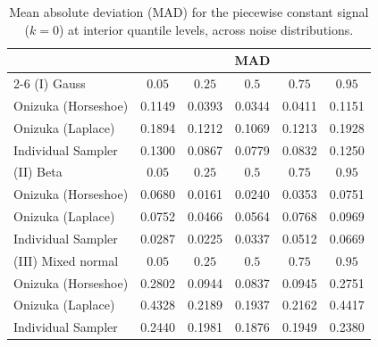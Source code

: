 \begin{table}[htbp]
\centering
\caption{Mean absolute deviation (MAD) for the piecewise constant signal ($k=0$) at interior quantile levels, across noise distributions.}
\label{tab:pc_int_mad}
\begin{tabular}{lccccc}
\toprule
& \multicolumn{5}{c}{MAD} \\
\cmidrule(lr){2-6}
(I) Gauss & $0.05$ & $0.25$ & $0.5$ & $0.75$ & $0.95$ \\
\midrule
Onizuka (Horseshoe) & 0.1149 & 0.0393 & 0.0344 & 0.0411 & 0.1151 \\
Onizuka (Laplace)   & 0.1894 & 0.1212 & 0.1069 & 0.1213 & 0.1928 \\
Individual Sampler  & 0.1300 & 0.0867 & 0.0779 & 0.0832 & 0.1250 \\
\midrule
(II) Beta & $0.05$ & $0.25$ & $0.5$ & $0.75$ & $0.95$ \\
\midrule
Onizuka (Horseshoe) & 0.0680 & 0.0161 & 0.0240 & 0.0353 & 0.0751 \\
Onizuka (Laplace)   & 0.0752 & 0.0466 & 0.0564 & 0.0768 & 0.0969 \\
Individual Sampler  & 0.0287 & 0.0225 & 0.0337 & 0.0512 & 0.0669 \\
\midrule
(III) Mixed normal & $0.05$ & $0.25$ & $0.5$ & $0.75$ & $0.95$ \\
\midrule
Onizuka (Horseshoe) & 0.2802 & 0.0944 & 0.0837 & 0.0945 & 0.2751 \\
Onizuka (Laplace)   & 0.4328 & 0.2189 & 0.1937 & 0.2162 & 0.4417 \\
Individual Sampler  & 0.2440 & 0.1981 & 0.1876 & 0.1949 & 0.2380 \\
\bottomrule
\end{tabular}
\end{table}

